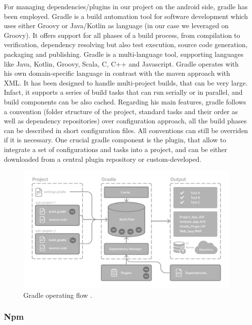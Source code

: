 For managing dependencies/plugins in our project on the android side, gradle has been employed. Gradle is a build automation tool for software development which uses either Groovy or Java/Kotlin as language (in our case we leveraged on Groovy). It offers support for all phases of a build process, from compilation to verification, dependency resolving but also test execution, source code generation, packaging and publishing. Gradle is a multi-language tool, supporting languages like Java, Kotlin, Groovy, Scala, C, C++ and Javascript. Gradle operates with his own domain-specific language in contrast with the maven approach with XML. It has been designed to handle multi-project builds, that can be very large. Infact, it supports a series of build tasks that can run serially or in parallel, and build components can be also cached. Regarding his main features, gradle follows a convention (folder structure of the project, standard tasks and their order as well as dependency repositories) over configuration approach, all the build phases can be described in short configuration files. All conventions can still be overriden if it is necessary. One crucial gradle component is the plugin, that allow to integrate a set of configurations and tasks into a project, and can be either downloaded from a central plugin repository or custom-developed\cite{Gradle}.

\begin{figure}
    \includegraphics[width=1.0\linewidth]{./images/gradle_basics.png}
    \caption[Gradle operating flow.]{Gradle operating flow \protect\cite{GradleBasics}.}
    \label{fig:gradleBasics}
\end{figure}

\subsubsection{Npm}

